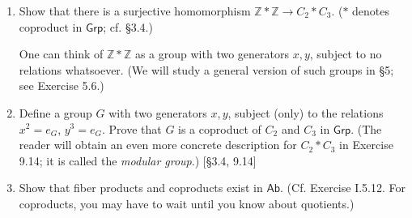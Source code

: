 \begin{enumerate}
    \item Show that there is a surjective homomorphism $\mathbb{Z} \ast \mathbb{Z} \to C_2 \ast C_3$. ($\ast$ denotes coproduct in $\mathsf{Grp}$; cf. \S3.4.)

          One can think of $\mathbb{Z} \ast \mathbb{Z}$ as a group with two generators $x, y$, subject to no relations whatsoever. (We will study a general version of such groups in \S5; see Exercise 5.6.)

    \item Define a group $G$ with two generators $x, y$, subject (only) to the relations $x^2 = e_G$, $y^3 = e_G$. Prove that $G$ is a coproduct of $C_2$ and $C_3$ in $\mathsf{Grp}$. (The reader will obtain an even more concrete description for $C_2 \ast C_3$ in Exercise 9.14; it is called the \textit{modular group}.) [\S3.4, 9.14]

    \item Show that fiber products and coproducts exist in $\mathsf{Ab}$. (Cf. Exercise I.5.12. For coproducts, you may have to wait until you know about quotients.)
\end{enumerate}